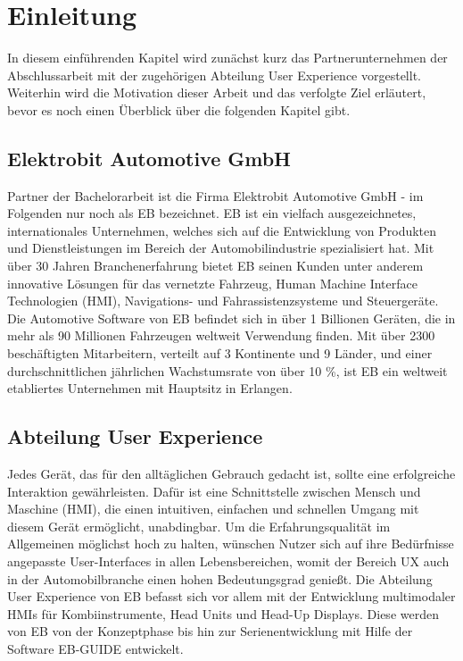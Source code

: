 \chapter{Einleitung}\label{ch:intro}

In diesem einführenden Kapitel wird zunächst kurz das Partnerunternehmen der Abschlussarbeit mit der zugehörigen Abteilung User Experience vorgestellt.
Weiterhin wird die Motivation dieser Arbeit und das verfolgte Ziel erläutert, bevor es noch einen Überblick über die folgenden Kapitel gibt.

\section{Elektrobit Automotive GmbH}
Partner der Bachelorarbeit ist die Firma Elektrobit Automotive GmbH - im Folgenden nur noch als EB bezeichnet.
EB ist ein vielfach ausgezeichnetes, internationales Unternehmen, welches sich auf die Entwicklung von Produkten und Dienstleistungen im Bereich der Automobilindustrie spezialisiert hat.
Mit über 30 Jahren Branchenerfahrung bietet EB seinen Kunden unter anderem innovative Lösungen für das vernetzte Fahrzeug, Human Machine Interface Technologien (HMI), Navigations- und Fahrassistenzsysteme und Steuergeräte. 
Die Automotive Software von EB befindet sich in über 1 Billionen Geräten, die in mehr als 90 Millionen Fahrzeugen weltweit Verwendung finden.
Mit über 2300 beschäftigten Mitarbeitern, verteilt auf 3 Kontinente und 9 Länder, und einer durchschnittlichen jährlichen Wachstumsrate von über 10 \%, ist EB ein weltweit etabliertes Unternehmen mit Hauptsitz in Erlangen\cite{about_eb}.

\section{Abteilung User Experience}
Jedes Gerät, das für den alltäglichen Gebrauch gedacht ist, sollte eine erfolgreiche Interaktion gewährleisten.
Dafür ist eine Schnittstelle zwischen Mensch und Maschine (HMI), die einen intuitiven, einfachen und schnellen Umgang mit diesem Gerät ermöglicht, unabdingbar.
Um die Erfahrungsqualität im Allgemeinen möglichst hoch zu halten, wünschen Nutzer sich auf ihre Bedürfnisse angepasste User-Interfaces in allen Lebensbereichen, womit der Bereich UX auch in der Automobilbranche einen hohen Bedeutungsgrad genießt.
Die Abteilung User Experience von EB befasst sich vor allem mit der Entwicklung multimodaler HMIs für Kombiinstrumente, Head Units und Head-Up Displays.
Diese werden von EB von der Konzeptphase bis hin zur Serienentwicklung mit Hilfe der Software EB-GUIDE entwickelt.

